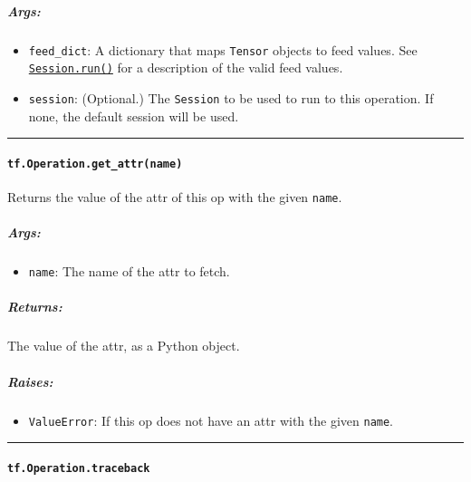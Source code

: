 \subparagraph{Args: }\label{args-12}

\begin{itemize}
\tightlist
\item
  \lstinline{feed_dict}: A dictionary that maps \lstinline{Tensor} objects to
  feed values. See
  \href{../../api_docs/python/client.md\#Session.run}{\lstinline{Session.run()}}
  for a description of the valid feed values.
\item
  \lstinline{session}: (Optional.) The \lstinline{Session} to be used to run
  to this operation. If none, the default session will be used.
\end{itemize}

\begin{center}\rule{0.5\linewidth}{\linethickness}\end{center}

\paragraph{\texorpdfstring{\lstinline{tf.Operation.get_attr(name)}
}{tf.Operation.get_attr(name) }}\label{tf.operation.getux5fattrname}

Returns the value of the attr of this op with the given \lstinline{name}.

\subparagraph{Args: }\label{args-13}

\begin{itemize}
\tightlist
\item
  \lstinline{name}: The name of the attr to fetch.
\end{itemize}

\subparagraph{Returns: }\label{returns-16}

The value of the attr, as a Python object.

\subparagraph{Raises: }\label{raises-6}

\begin{itemize}
\tightlist
\item
  \lstinline{ValueError}: If this op does not have an attr with the given
  \lstinline{name}.
\end{itemize}

\begin{center}\rule{0.5\linewidth}{\linethickness}\end{center}

\paragraph{\texorpdfstring{\lstinline{tf.Operation.traceback}
}{tf.Operation.traceback }}\label{tf.operation.traceback}

